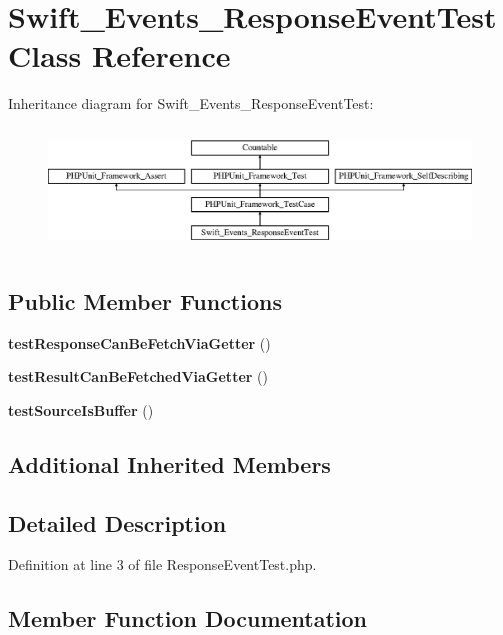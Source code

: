 \section{Swift\+\_\+\+Events\+\_\+\+Response\+Event\+Test Class Reference}
\label{class_swift___events___response_event_test}
Inheritance diagram for Swift\+\_\+\+Events\+\_\+\+Response\+Event\+Test\+:\begin{figure}[H]
\begin{center}
\leavevmode
\includegraphics[height=3.303835cm]{class_swift___events___response_event_test}
\end{center}
\end{figure}
\subsection*{Public Member Functions}
\begin{DoxyCompactItemize}
\item 
{\bf test\+Response\+Can\+Be\+Fetch\+Via\+Getter} ()
\item 
{\bf test\+Result\+Can\+Be\+Fetched\+Via\+Getter} ()
\item 
{\bf test\+Source\+Is\+Buffer} ()
\end{DoxyCompactItemize}
\subsection*{Additional Inherited Members}


\subsection{Detailed Description}


Definition at line 3 of file Response\+Event\+Test.\+php.



\subsection{Member Function Documentation}
